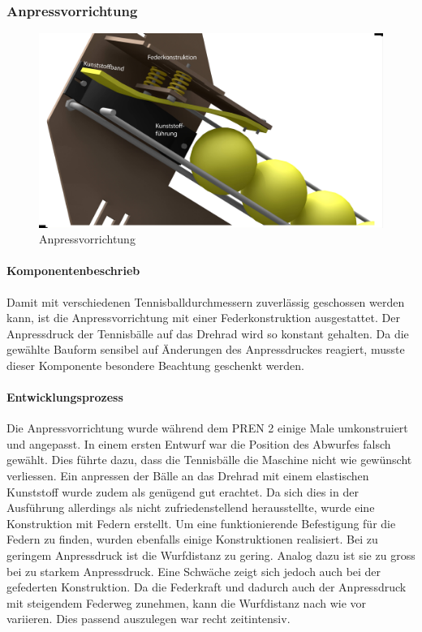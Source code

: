 \subsubsection{Anpressvorrichtung}
\begin{figure}[h!]
	\centering
	\includegraphics[width=\linewidth]{../../fig/Render-Anpressvorrichtungx}
	\caption{Anpressvorrichtung}
	\label{fig:Anpressvorrichtung}
\end{figure}

\paragraph{Komponentenbeschrieb\\}
Damit mit verschiedenen Tennisballdurchmessern zuverlässig geschossen werden kann, ist die Anpressvorrichtung mit einer Federkonstruktion ausgestattet. Der Anpressdruck der Tennisbälle auf das Drehrad wird so konstant gehalten. Da die gewählte Bauform sensibel auf Änderungen des Anpressdruckes reagiert, musste dieser Komponente besondere Beachtung geschenkt werden. 

\paragraph{Entwicklungsprozess\\}
Die Anpressvorrichtung wurde während dem PREN 2 einige Male umkonstruiert und angepasst. In einem ersten Entwurf war die Position des Abwurfes falsch gewählt. Dies führte dazu, dass die Tennisbälle die Maschine nicht wie gewünscht verliessen. Ein anpressen der Bälle an das Drehrad mit einem elastischen Kunststoff wurde zudem als genügend gut erachtet. Da sich dies in der Ausführung allerdings als nicht zufriedenstellend herausstellte, wurde eine Konstruktion mit Federn erstellt. Um eine funktionierende Befestigung für die Federn zu finden, wurden ebenfalls einige Konstruktionen realisiert. Bei zu geringem Anpressdruck ist die Wurfdistanz zu gering. Analog dazu ist sie zu gross bei zu starkem Anpressdruck. Eine Schwäche zeigt sich jedoch auch bei der gefederten Konstruktion. Da die Federkraft und dadurch auch der Anpressdruck mit steigendem Federweg zunehmen, kann die Wurfdistanz nach wie vor variieren. Dies passend auszulegen war recht zeitintensiv.